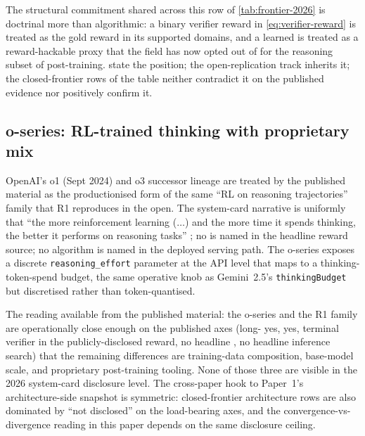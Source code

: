 The structural commitment shared across this row of
\cref{tab:frontier-2026} is doctrinal more than algorithmic: a binary
verifier reward in \cref{eq:verifier-reward} is treated as the gold
reward in its supported domains, and a learned  is treated
as a reward-hackable proxy that the field has now opted out of for the
reasoning subset of post-training. \citet[\S 2.2]{deepseek-r1} state
the position; the open-replication track inherits it; the closed-frontier
rows of the table neither contradict it on the published evidence nor
positively confirm it.

\subsection{o-series: RL-trained thinking with proprietary mix}
\label{sec:frontier-o-series}

OpenAI's o1 (Sept 2024) and o3 successor lineage  are
treated by the published material as the productionised form of the
same ``RL on reasoning trajectories'' family that R1 reproduces in the
open. The system-card narrative is uniformly that ``the more
reinforcement learning ($\ldots$) and the more time it spends thinking,
the better it performs on reasoning tasks''
; no  is named in the headline
reward source; no  algorithm is named in the
deployed serving path. The o-series exposes a discrete
\texttt{reasoning\_effort} parameter at the API level
 that maps to a
thinking-token-spend budget, the same operative knob as Gemini~2.5's
\texttt{thinkingBudget} but discretised rather than token-quantised.

The reading available from the published material: the o-series and the
R1 family are operationally close enough on the published axes
(long- yes,  yes, terminal verifier in the publicly-disclosed
reward, no headline , no headline inference search) that the
remaining differences are training-data composition, base-model scale,
and proprietary post-training tooling. None of those three are visible
in the 2026 system-card disclosure level. The cross-paper hook to
Paper~1's architecture-side snapshot is symmetric: closed-frontier
architecture rows are also dominated by ``not disclosed'' on the
load-bearing axes, and the convergence-vs-divergence reading in this
paper depends on the same disclosure ceiling.

